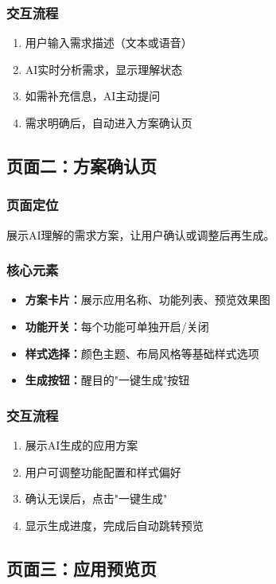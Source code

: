 \documentclass[a4paper,12pt]{ctexart}
\begin{document}
\subsubsection{交互流程}
\begin{enumerate}[leftmargin=2em]
    \item 用户输入需求描述（文本或语音）
    \item AI实时分析需求，显示理解状态
    \item 如需补充信息，AI主动提问
    \item 需求明确后，自动进入方案确认页
\end{enumerate}

\subsection{页面二：方案确认页}

\subsubsection{页面定位}
展示AI理解的需求方案，让用户确认或调整后再生成。

\subsubsection{核心元素}
\begin{itemize}[leftmargin=2em]
    \item \textbf{方案卡片：}展示应用名称、功能列表、预览效果图
    \item \textbf{功能开关：}每个功能可单独开启/关闭
    \item \textbf{样式选择：}颜色主题、布局风格等基础样式选项
    \item \textbf{生成按钮：}醒目的"一键生成"按钮
\end{itemize}

\subsubsection{交互流程}
\begin{enumerate}[leftmargin=2em]
    \item 展示AI生成的应用方案
    \item 用户可调整功能配置和样式偏好
    \item 确认无误后，点击"一键生成"
    \item 显示生成进度，完成后自动跳转预览
\end{enumerate}

\subsection{页面三：应用预览页}
\end{document}
